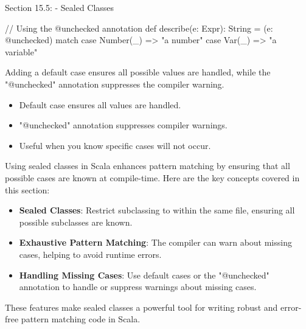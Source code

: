\begin{notes}{Section 15.5: - Sealed Classes}
\begin{highlight}
\begin{code}[Scala]
    // Using the @unchecked annotation
    def describe(e: Expr): String = (e: @unchecked) match {
        case Number(_) => "a number"
        case Var(_) => "a variable"
    }
    \end{code}
    
        Adding a default case ensures all possible values are handled, while the "@unchecked" annotation suppresses the compiler warning.
        
        \begin{itemize}
            \item Default case ensures all values are handled.
            \item "@unchecked" annotation suppresses compiler warnings.
            \item Useful when you know specific cases will not occur.
        \end{itemize}
    
    \end{highlight}
    
    \begin{highlight}
    
        Using sealed classes in Scala enhances pattern matching by ensuring that all possible cases are known at compile-time. Here are the key concepts covered in this section:
        
        \begin{itemize}
            \item \textbf{Sealed Classes}: Restrict subclassing to within the same file, ensuring all possible subclasses are known.
            \item \textbf{Exhaustive Pattern Matching}: The compiler can warn about missing cases, helping to avoid runtime errors.
            \item \textbf{Handling Missing Cases}: Use default cases or the "@unchecked" annotation to handle or suppress warnings about missing cases.
        \end{itemize}
        
        These features make sealed classes a powerful tool for writing robust and error-free pattern matching code in Scala.
    
    \end{highlight}
\end{notes}